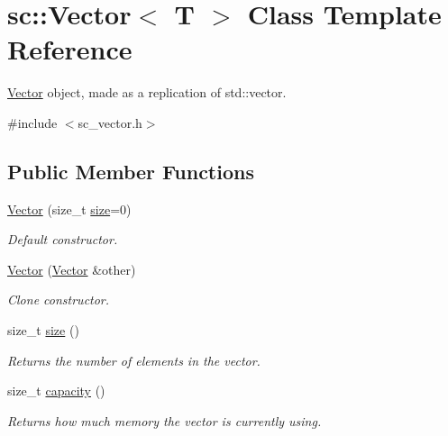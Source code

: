 \hypertarget{classsc_1_1Vector}{}\section{sc\+:\+:Vector$<$ T $>$ Class Template Reference}
\label{classsc_1_1Vector}


\hyperlink{classsc_1_1Vector}{Vector} object, made as a replication of std\+::vector.  




{\ttfamily \#include $<$sc\+\_\+vector.\+h$>$}

\subsection*{Public Member Functions}
\begin{DoxyCompactItemize}
\item 
\hyperlink{classsc_1_1Vector_a4832f9a5721078c4d2c89370f0fd96d0}{Vector} (size\+\_\+t \hyperlink{classsc_1_1Vector_a2ccab0421fad94601e6bd5e344aa3340}{size}=0)
\begin{DoxyCompactList}\small\item\em Default constructor. \end{DoxyCompactList}\item 
\hyperlink{classsc_1_1Vector_a2b482471a80d2570089ad1cd68aae03e}{Vector} (\hyperlink{classsc_1_1Vector}{Vector} \&other)
\begin{DoxyCompactList}\small\item\em Clone constructor. \end{DoxyCompactList}\item 
\mbox{\label{classsc_1_1Vector_a2ccab0421fad94601e6bd5e344aa3340}} 
size\+\_\+t \hyperlink{classsc_1_1Vector_a2ccab0421fad94601e6bd5e344aa3340}{size} ()
\begin{DoxyCompactList}\small\item\em Returns the number of elements in the vector. \end{DoxyCompactList}\item 
\mbox{\label{classsc_1_1Vector_a1786a092f4737cbfa29a748efa96476a}} 
size\+\_\+t \hyperlink{classsc_1_1Vector_a1786a092f4737cbfa29a748efa96476a}{capacity} ()
\begin{DoxyCompactList}\small\item\em Returns how much memory the vector is currently using. \end{DoxyCompactList}\item 

\end{DoxyCompactItemize}

